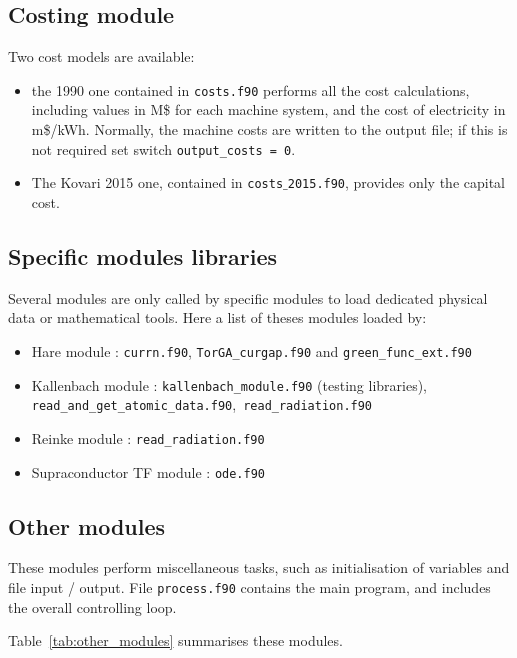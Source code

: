 \documentclass[11pt,a4paper]{report}
\begin{document}
\subsection{Costing module}
Two cost models are available:
\begin{itemize}
	\item the 1990 one contained in \texttt{costs.f90} performs all the cost calculations, 
		including values in M\$ for each machine system, and the cost of electricity
		in m\$/kWh. Normally, the machine costs are written to the output file; if
		this is not required set switch \texttt{output\_costs = 0}. 
	\item The Kovari 2015 one, contained in \texttt{costs$\_$2015.f90}, provides only the capital cost.
\end{itemize}


\subsection{Specific modules libraries}

Several modules are only called by specific modules to load dedicated physical data or mathematical tools. Here a list of theses modules loaded by:
\begin{itemize}
	\item Hare module : \texttt{currn.f90}, \texttt{TorGA\_curgap.f90} and \texttt{green\_func\_ext.f90}
	\item Kallenbach module : \texttt{kallenbach\_module.f90} (testing libraries), \texttt{read\_and\_get\_atomic\_data.f90},\ \texttt{read\_radiation.f90}
	\item Reinke module : \texttt{read\_radiation.f90}
	\item Supraconductor TF module : \texttt{ode.f90}
\end{itemize}


\subsection{Other modules}
These modules perform miscellaneous tasks, such as initialisation of variables
and file input / output. File \texttt{process.f90} contains the main program,
and includes the overall controlling loop.

Table~\ref{tab:other_modules} summarises these modules.
\end{document}
